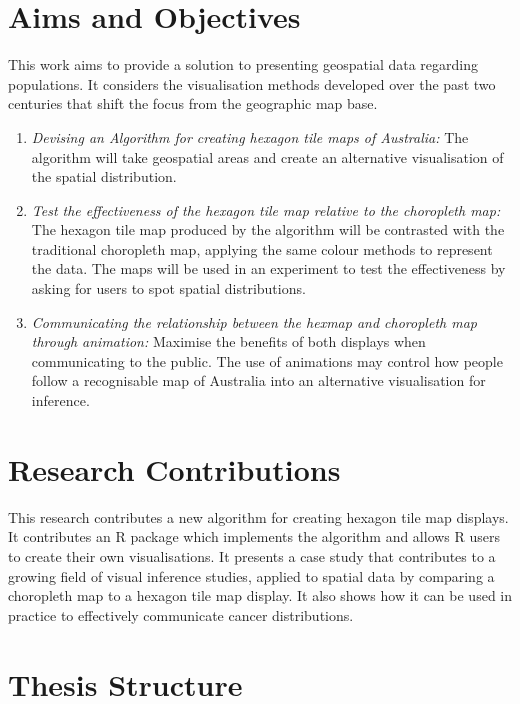 \documentclass{monashthesis}
\begin{document}
\hypertarget{aims-and-objectives}{%
\section{Aims and Objectives}\label{aims-and-objectives}}

This work aims to provide a solution to presenting geospatial data regarding populations.
It considers the visualisation methods developed over the past two centuries that shift the focus from the geographic map base.

\begin{enumerate}
\def\labelenumi{\arabic{enumi}.}
\item
  \emph{Devising an Algorithm for creating hexagon tile maps of Australia:} The algorithm will take geospatial areas and create an alternative visualisation of the spatial distribution.
\item
  \emph{Test the effectiveness of the hexagon tile map relative to the choropleth map:} The hexagon tile map produced by the algorithm will be contrasted with the traditional choropleth map, applying the same colour methods to represent the data. The maps will be used in an experiment to test the effectiveness by asking for users to spot spatial distributions.
\item
  \emph{Communicating the relationship between the hexmap and choropleth map through animation:} Maximise the benefits of both displays when communicating to the public. The use of animations may control how people follow a recognisable map of Australia into an alternative visualisation for inference.
\end{enumerate}

\hypertarget{research-contributions}{%
\section{Research Contributions}\label{research-contributions}}

This research contributes a new algorithm for creating hexagon tile map displays. It contributes an R \autocite{R} package which implements the algorithm and allows R users to create their own visualisations.
It presents a case study that contributes to a growing field of visual inference studies, applied to spatial data by comparing a choropleth map to a hexagon tile map display.
It also shows how it can be used in practice to effectively communicate cancer distributions.

\hypertarget{thesis-structure}{%
\section{Thesis Structure}\label{thesis-structure}}
\end{document}
